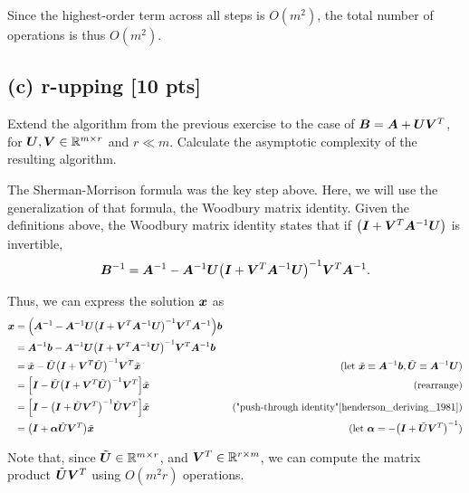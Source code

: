 \documentclass[twoside,10pt]{article}
\begin{document}
\quad Since the highest-order term across all steps is $O(m^2)$, the total number of operations is thus $O(m^2)$.

\subsection*{(c) r-upping [10 pts]}
Extend the algorithm from the previous exercise to the case of $\bm{B} = \bm{A} + \bm{U}\bm{V}^{T}$, for $\bm{U},\bm{V} \in \mathbb{R}^{m \times r}$ and $r \ll m$.
Calculate the asymptotic complexity of the resulting algorithm.

\quad The Sherman-Morrison formula was the key step above.
Here, we will use the generalization of that formula, the Woodbury matrix identity.
Given the definitions above, the Woodbury matrix identity states that if $\left(\mtx{I} + \mtx{V}^T\mtx{A}^{-1} \mtx{U}\right)$ is invertible,
$$\mtx{B}^{-1} = \mtx{A}^{-1} - \mtx{A}^{-1}\mtx{U} \left(\mtx{I} + \mtx{V}^T\mtx{A}^{-1}\mtx{U}\right)^{-1} \mtx{V}^T\mtx{A}^{-1}.$$

Thus, we can express the solution $\bm{x}$ as
\begin{align*}
  \vct{x} &= \left(\mtx{A}^{-1} - \mtx{A}^{-1}\mtx{U} \left(\mtx{I} + \mtx{V}^T\mtx{A}^{-1}\mtx{U}\right)^{-1} \mtx{V}^T\mtx{A}^{-1}\right)\vct{b}\\
  &= \mtx{A}^{-1}\vct{b} - \mtx{A}^{-1}\mtx{U} \left(\mtx{I} + \mtx{V}^T\mtx{A}^{-1}\mtx{U}\right)^{-1} \mtx{V}^T\mtx{A}^{-1}\vct{b}\\
  &= \tilde{\vct{x}} - \tilde{\mtx{U}} \left(\mtx{I} + \mtx{V}^T\tilde{\mtx{U}}\right)^{-1} \mtx{V}^T\tilde{\vct{x}} &\text{(let $\tilde{\vct{x}} \equiv \mtx{A}^{-1}\vct{b}, \tilde{\mtx{U}} \equiv \mtx{A}^{-1}\mtx{U}$)}\\
  &= \left[\mtx{I} - \tilde{\mtx{U}} \left(\mtx{I} + \mtx{V}^T\tilde{\mtx{U}}\right)^{-1} \mtx{V}^T\right]\tilde{\vct{x}} &\text{(rearrange)}\\
  &= \left[\mtx{I} - \left(\mtx{I} + \tilde{\mtx{U}}\mtx{V}^T\right)^{-1}\tilde{\mtx{U}}\mtx{V}^T\right]\tilde{\vct{x}} &\text{("push-through identity"\cite{henderson_deriving_1981})}\\
  &= \left(\mtx{I} + \mtx{\alpha}\tilde{\mtx{U}}\mtx{V}^T\right)\tilde{\vct{x}} &\text{(let $\mtx{\alpha} =- \left(\mtx{I} + \tilde{\mtx{U}}\mtx{V}^T\right)^{-1}$)}
\end{align*}

Note that, since $\tilde{\bm{U}} \in \mathbb{R}^{m \times r}$, and $\bm{V}^T \in \mathbb{R}^{r \times m}$, we can compute the matrix product $\tilde{\bm{U}}\bm{V}^T$ using $O(m^2r)$ operations.
\end{document}
